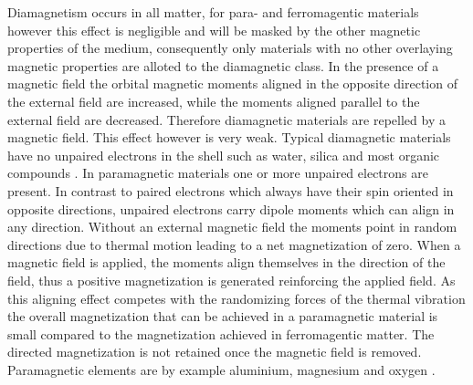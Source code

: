 Diamagnetism occurs in all matter, for para- and ferromagentic materials however this effect is negligible and will be masked by the other magnetic properties of the medium, consequently only materials with no other overlaying magnetic properties are alloted to the diamagnetic class. In the presence of a magnetic field the orbital magnetic moments aligned in the opposite direction of the external field are increased, while the moments aligned parallel to the external field are decreased. Therefore diamagnetic materials are repelled by a magnetic field. This effect however is very weak. Typical diamagnetic materials have no unpaired electrons in the shell such as water, silica and most organic compounds \cite{svoboda2004magnetic,griffiths2011elektrodynamik}.\newline
In paramagnetic materials one or more unpaired electrons are present. In contrast to paired electrons which always have their spin oriented in opposite directions, unpaired electrons carry dipole moments which can align in any direction. Without an external magnetic field the moments point in random directions due to thermal motion leading to a net magnetization of zero. When a magnetic field is applied, the moments align themselves in the direction of the field, thus a positive magnetization is generated reinforcing the applied field. As this aligning effect competes with the randomizing forces of the thermal vibration the overall magnetization that can be achieved in a paramagnetic material is small compared to the magnetization achieved in ferromagentic matter. The directed magnetization is not retained once the magnetic field is removed. Paramagnetic elements are by example aluminium, magnesium and oxygen \cite{svoboda2004magnetic,griffiths2011elektrodynamik}.\newline  %
